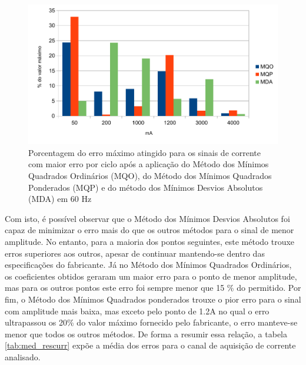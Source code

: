 \begin{figure}[H]
    \caption{Porcentagem do erro máximo atingido para os sinais de corrente com maior erro por ciclo após a aplicação do Método dos Mínimos Quadrados Ordinários (MQO), do Método dos Mínimos Quadrados Ponderados (MQP) e do método dos Mínimos Desvios Absolutos (MDA) em 60 Hz}
    \label{fig:res_curr}
    \centering
    \includegraphics[width=0.9\linewidth]{pictures/max_err_IA_aftercalib60Hz}
\end{figure}

Com isto, é possível observar que o Método dos Mínimos Desvios Absolutos foi capaz de minimizar o erro mais do que os outros métodos para o sinal de menor amplitude. No entanto, para a maioria dos pontos seguintes, este método trouxe erros superiores aos outros, apesar de continuar mantendo-se dentro das especificações do fabricante. Já no Método dos Mínimos Quadrados Ordinários, os coeficientes obtidos geraram um maior erro para o ponto de menor amplitude, mas para os outros pontos este erro foi sempre menor que 15 \% do permitido. Por fim, o Método dos Mínimos Quadrados ponderados trouxe o pior erro para o sinal com amplitude mais baixa, mas exceto pelo ponto de 1.2A no qual o erro ultrapassou os 20\% do valor máximo fornecido pelo fabricante, o erro manteve-se menor que todos os outros métodos. De forma a resumir essa relação, a tabela \ref{tab:med_rescurr} expõe a média dos erros para o canal de aquisição de corrente analisado.

\begin{table}[H]
\end{table}

